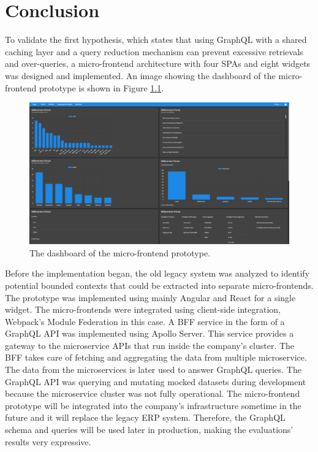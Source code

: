 \chapter{Conclusion}\label{chapter:conclusion}

\noindent To validate the first hypothesis, which states that using GraphQL with a shared caching layer and a query reduction mechanism can prevent excessive retrievals and over-queries, a micro-frontend architecture with four \acp{SPA} and eight widgets was designed and implemented. An image showing the dashboard of the micro-frontend prototype is shown in Figure \ref{fig:conclusion:ui-dashboard}.

\ifshowImages
\begin{figure}[H]
  \centering
  \includegraphics[width=1\linewidth]{images/prototype-screenshots/ui-dashboard.png}
  \caption{The dashboard of the micro-frontend prototype.}\label{fig:conclusion:ui-dashboard}
\end{figure}
\fi

\noindent Before the implementation began, the old legacy system was analyzed to identify potential bounded contexts that could be extracted into separate micro-frontends. The prototype was implemented using mainly Angular and React for a single widget. The micro-frontends were integrated using client-side integration, Webpack's Module Federation in this case. A \ac{BFF} service in the form of a GraphQL \ac{API} was implemented using Apollo Server. This service provides a gateway to the microservice \acp{API} that run inside the company's cluster. The \ac{BFF} takes care of fetching and aggregating the data from multiple microservice. The data from the microservices is later used to answer GraphQL queries. The GraphQL \ac{API} was querying and mutating mocked datasets during development because the microservice cluster was not fully operational. The micro-frontend prototype will be integrated into the company's infrastructure sometime in the future and it will replace the legacy \ac{ERP} system. Therefore, the GraphQL schema and queries will be used later in production, making the evaluations' results very expressive.


